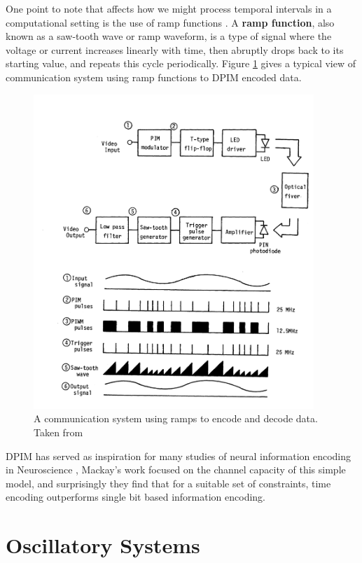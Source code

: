 \documentclass{article}
\begin{document}
One point to note that affects how we might process temporal intervals in a computational setting is the use of ramp functions \cite{sato1978pulse}. A \textbf{ramp function}, also known as a saw-tooth wave or ramp waveform, is a type of signal where the voltage or current increases linearly with time, then abruptly drops back to its starting value, and repeats this cycle periodically. Figure \ref{fig:pim} gives a typical view of communication system using ramp functions to DPIM encoded data. 

\begin{figure}[ht]
\centerline{\includegraphics[width=300pt]{figures/PIM.png}}
\caption{A communication system using ramps to encode and decode data. Taken from \cite{sato1978pulse}}\label{fig:pim}
\end{figure}

DPIM has served as inspiration for many studies of neural information encoding in Neuroscience \cite{meister1999neural} \cite{rieke1995naturalistic} \cite{borst1999information}, Mackay's work \cite{MacKay1952} focused on the channel capacity of this simple model, and surprisingly they find that for a suitable set of constraints, time encoding outperforms single bit based information encoding.

\section{Oscillatory Systems}\label{oscil}
\end{document}
